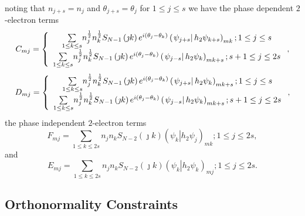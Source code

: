 \documentclass[aps,preprint]{revtex4}%
\begin{document}
noting that $n_{j+s}=n_{j}$ and $\theta_{j+s}=\theta_{j}$ for $1\leq j\leq s$
we have the phase dependent $2$-electron terms
\begin{equation}
C_{mj}=\left\{
\begin{array}
[c]{c}%
{\textstyle\sum\limits_{1\leq k\leq s}}
n_{j}^{\frac{1}{2}}n_{k}^{\frac{1}{2}}S_{N-1}\left(  \jmath k\right)
e^{i\left(  \theta_{j}-\theta_{k}\right)  }\left(  \left.  \psi_{j+s}%
\right\vert h_{2}\psi_{k+s}\right)  _{mk};1\leq j\leq s\\%
{\textstyle\sum\limits_{1\leq k\leq s}}
n_{j}^{\frac{1}{2}}n_{k}^{\frac{1}{2}}S_{N-1}\left(  \jmath k\right)
e^{i\left(  \theta_{j}-\theta_{k}\right)  }\left(  \left.  \psi_{j-s}%
\right\vert h_{2}\psi_{k}\right)  _{mk+s};s+1\leq j\leq2s
\end{array}
\right.  ,
\end{equation}%
\begin{equation}
D_{mj}=\left\{
\begin{array}
[c]{c}%
{\textstyle\sum\limits_{1\leq k\leq s}}
n_{j}^{\frac{1}{2}}n_{k}^{\frac{1}{2}}S_{N-1}\left(  \jmath k\right)
e^{i\left(  \theta_{j}-\theta_{k}\right)  }\left(  \left.  \psi_{j+s}%
\right\vert h_{2}\psi_{k}\right)  _{mk+s};1\leq j\leq s\\%
{\textstyle\sum\limits_{1\leq k\leq s}}
n_{j}^{\frac{1}{2}}n_{k}^{\frac{1}{2}}S_{N-1}\left(  \jmath k\right)
e^{i\left(  \theta_{j}-\theta_{k}\right)  }\left(  \left.  \psi_{j-s}%
\right\vert h_{2}\psi_{k}\right)  _{mk+s};s+1\leq j\leq2s
\end{array}
\right.  ,
\end{equation}
the phase independent $2$-electron terms
\begin{equation}
F_{mj}=\sum_{1\leq k\leq2s}n_{j}n_{k}S_{N-2}\left(  \jmath k\right)  \left(
\left.  \psi_{k}\right\vert h_{2}\psi_{j}\right)  _{mk};1\leq j\leq2s,
\end{equation}
and%
\begin{equation}
E_{mj}=\sum_{1\leq k\leq2s}n_{j}n_{k}S_{N-2}\left(  \jmath k\right)  \left(
\left.  \psi_{k}\right\vert h_{2}\psi_{k}\right)  _{mj};1\leq j\leq2s.
\end{equation}


\subsection{Orthonormality Constraints}
\end{document}
